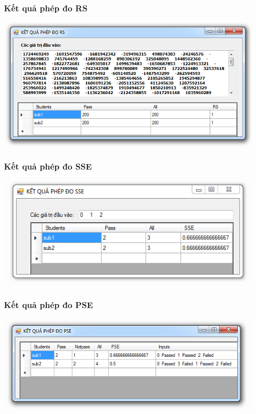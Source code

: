 \documentclass{beamer}
\begin{document}
\begin{frame}
  \frametitle{Kết quả phép đo RS}
  \centering \includegraphics[width=0.8\linewidth]{images/kq_rs.png}
\end{frame}

\begin{frame}
\frametitle{Kết quả phép đo SSE}
\centering
\includegraphics[width=0.8\linewidth]{images/kq_sse.png} 
\end{frame}

\begin{frame}
\frametitle{Kết quả phép đo PSE}
\centering
\includegraphics[width=0.8\linewidth]{images/kq_pse.png}
\end{frame}
\end{document}
